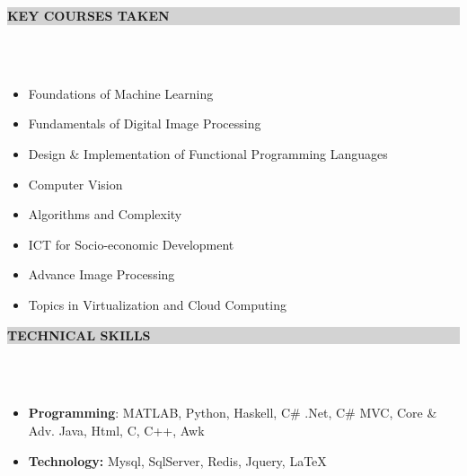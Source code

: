 \documentclass[a4paper,10pt]{article}
\newcommand{\hsep}{-0.6cm}
\newcommand{\resheading}[1]{{\small \colorbox{lightgray}{\begin{minipage}{1\textwidth}{\textbf{#1 \vphantom{p\^{E}}}}\end{minipage}}}}
\begin{document}
\hspace{-0.5cm}
\resheading{\textbf{\large KEY COURSES TAKEN}}\\[\hsep]
\\[0.45cm]
\noindent
\begin{minipage}{.4\textwidth}
    \begin{itemize}
		\item Foundations of Machine Learning\\[-0.7cm]
		\item Fundamentals of Digital Image Processing \\[-0.7cm]
		\item Design \& Implementation of Functional Programming Languages \\[-0.7cm]
		
	\end{itemize}
\end{minipage} 
\noindent
\begin{minipage}{.31\textwidth}
    \begin{itemize}
    	\item Computer Vision \\[-0.7cm]
    	\item Algorithms and Complexity \\[-0.7cm]
    	\item ICT for Socio-economic Development \\[-0.7cm]
	\end{itemize}
\end{minipage}   
\noindent
\begin{minipage}{.29\textwidth}
	\begin{itemize}
		\item Advance Image Processing \\[-0.7cm]
		\item Topics in Virtualization and Cloud Computing \\ [-0.7cm]
	\end{itemize}
\end{minipage}
\vspace{0.3cm}

\hspace{-0.5cm}
\resheading{\textbf{\large TECHNICAL SKILLS}}\\[\hsep]
\\[-0.2cm]
\begin{itemize}
\item \noindent \textbf {Programming}: MATLAB, Python, Haskell, C\# .Net, C\# MVC, Core \& Adv. Java, Html, C, C++, Awk\\[-0.55cm]
\item\textbf {Technology:} Mysql, SqlServer, Redis, Jquery, LaTeX\\[-0.45cm]
\end{itemize}
\end{document}
